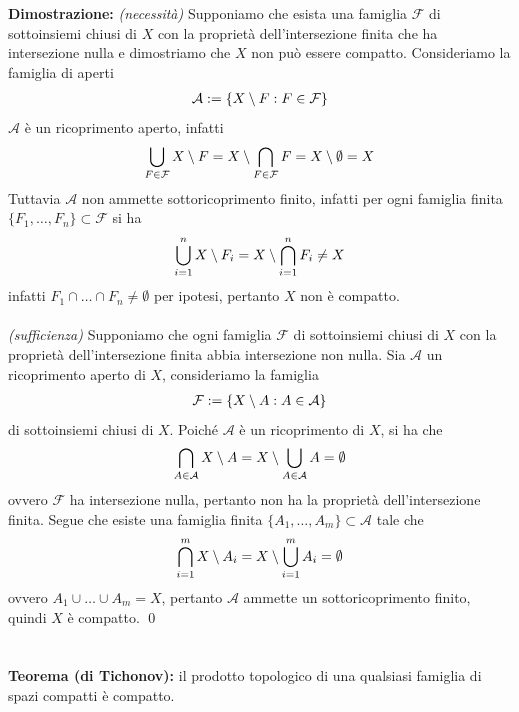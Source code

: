 \documentclass{article}
\begin{document}
\textbf{Dimostrazione:} \textit{(necessità)} Supponiamo che esista una famiglia $\mathcal{F}$ di sottoinsiemi chiusi di $X$ con la proprietà dell'intersezione finita che ha intersezione nulla e dimostriamo che $X$ non può essere compatto. Consideriamo la famiglia di aperti
\begin{gather}
    \mathcal{A} := \{ X \setminus F : F \in \mathcal{F} \} \notag
\end{gather}
$\mathcal{A}$ è un ricoprimento aperto, infatti
\begin{gather}
    \bigcup_{F \in \mathcal{F}} X \setminus F = X \setminus \bigcap_{F \in \mathcal{F}} F = X \setminus \emptyset = X \notag
\end{gather}
Tuttavia $\mathcal{A}$ non ammette sottoricoprimento finito, infatti per ogni famiglia finita $\{ F_1, \dots, F_n \} \subset \mathcal{F}$ si ha
\begin{gather}
    \bigcup_{i = 1}^n X \setminus F_i = X \setminus \bigcap_{i = 1}^n F_i \neq X \notag 
\end{gather}
infatti $F_1 \cap \dots \cap F_n \neq \emptyset$ per ipotesi, pertanto $X$ non è compatto. \\ \\
\textit{(sufficienza)} Supponiamo che ogni famiglia $\mathcal{F}$ di sottoinsiemi chiusi di $X$ con la proprietà dell'intersezione finita abbia intersezione non nulla. Sia $\mathcal{A}$ un ricoprimento aperto di $X$, consideriamo la famiglia
\begin{gather}
    \mathcal{F} := \{ X \setminus A : A \in \mathcal{A} \} \notag
\end{gather}
di sottoinsiemi chiusi di $X$. Poiché $\mathcal{A}$ è un ricoprimento di $X$, si ha che
\begin{gather}
    \bigcap_{A \in \mathcal{A}} X \setminus A = X \setminus \bigcup_{A \in \mathcal{A}} A = \emptyset \notag
\end{gather}
ovvero $\mathcal{F}$ ha intersezione nulla, pertanto non ha la proprietà dell'intersezione finita. Segue che esiste una famiglia finita $\{ A_1, \dots, A_m \} \subset \mathcal{A}$ tale che
\begin{gather}
    \bigcap_{i = 1}^m X \setminus A_i = X \setminus \bigcup_{i = 1}^m A_i = \emptyset \notag
\end{gather}
ovvero $A_1 \cup \dots \cup A_m = X$, pertanto $\mathcal{A}$ ammette un sottoricoprimento finito, quindi $X$ è compatto. \qed \\ \\ \\
\textbf{Teorema (di Tichonov):} il prodotto topologico di una qualsiasi famiglia di spazi compatti è compatto. \\
\end{document}
